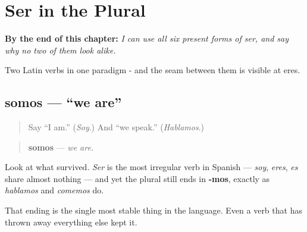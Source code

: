 
\chapter{Ser in the Plural}
\label{ch:spanish-ser-plural}

\begin{chapteropening}
\textbf{By the end of this chapter:} \emph{I can use all six present forms of ser, and say why no two of them look alike.}

Two Latin verbs in one paradigm - and the seam between them is visible at eres.
\end{chapteropening}

\section[somos]{somos — \textquotedblleft{}we are\textquotedblright{}}

\label{lesson:ES-C09-somos}



\begin{quote}
Say \textquotedblleft{}I am.\textquotedblright{} (\emph{Soy}.) And \textquotedblleft{}we speak.\textquotedblright{} (\emph{Hablamos}.)
\end{quote}

\begin{grammarlens}[title={Grammar Lens: the -mos survives even here}]
\begin{quote}
\textbf{somos} — \emph{we are.}
\end{quote}

Look at what survived. \emph{Ser} is the most irregular verb in Spanish — \emph{soy}, \emph{eres}, \emph{es} share almost nothing — and yet the plural still ends in \textbf{-mos}, exactly as \emph{hablamos} and \emph{comemos} do.

That ending is the single most stable thing in the language. Even a verb that has thrown away everything else kept it.
\end{grammarlens}

